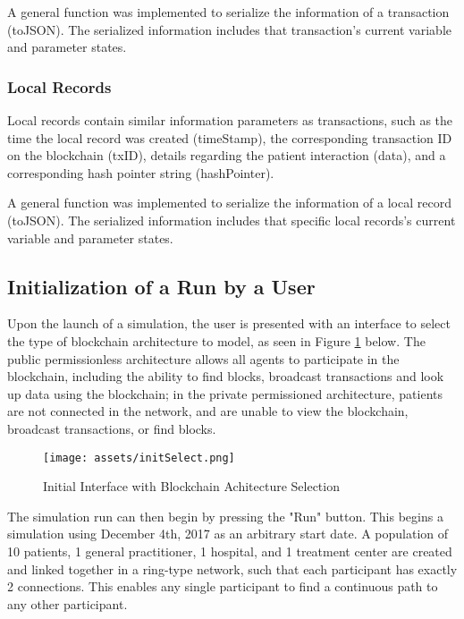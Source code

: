 \documentclass[12pt]{report}
\begin{document}
A general function was implemented to serialize the  information of a transaction (toJSON). The serialized information includes that transaction's current variable and parameter states.

\subsubsection{Local Records}
Local records contain similar information parameters as transactions, such as the time the local record was created (timeStamp), the corresponding transaction ID on the blockchain (txID), details regarding the patient interaction (data), and a corresponding hash pointer string (hashPointer).

A general function was implemented to serialize the  information of a local record (toJSON). The serialized information includes that specific local records's current variable and parameter states.

\subsection{Initialization of a Run by a User}
Upon the launch of a simulation, the user is presented with an interface to select the type of blockchain architecture to model, as seen in Figure \ref{fig:initSelect} below. The public permissionless architecture allows all agents to participate in the blockchain, including the ability to find blocks, broadcast transactions and look up data using the blockchain; in the private permissioned architecture, patients are not connected in the network, and are unable to view the blockchain, broadcast transactions, or find blocks.

\begin{figure}[h]
\begin{center}
\texttt{[image: assets/initSelect.png]}
\end{center}
\caption{Initial Interface with Blockchain Achitecture Selection}
\label{fig:initSelect}
\end{figure}

The simulation run can then begin by pressing the "Run" button. This begins a simulation using December 4th, 2017 as an arbitrary start date. A population of 10 patients, 1 general practitioner, 1 hospital, and 1 treatment center are created and linked together in a ring-type network, such that each participant has exactly 2 connections. This enables any single participant to find a continuous path to any other participant.
\end{document}
